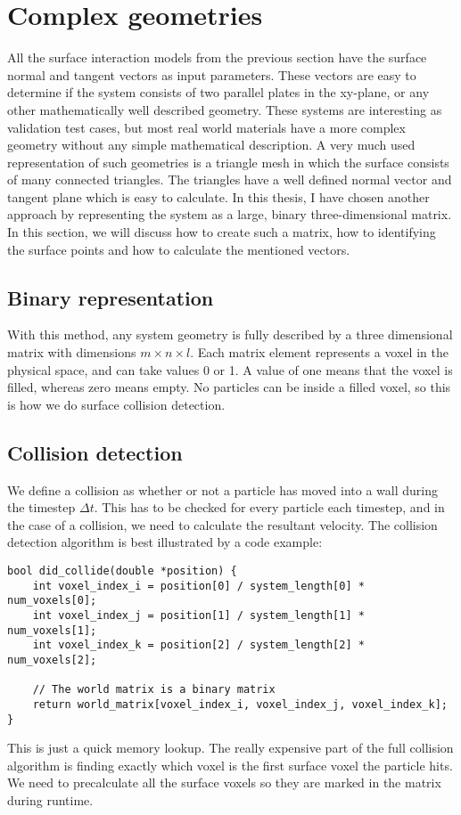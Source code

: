 \section{Complex geometries}
All the surface interaction models from the previous section have the surface normal and tangent vectors as input parameters. These vectors are easy to determine if the system consists of two parallel plates in the xy-plane, or any other mathematically well described geometry. These systems are interesting as validation test cases, but most real world materials have a more complex geometry without any simple mathematical description. A very much used representation of such geometries is a triangle mesh in which the surface consists of many connected triangles. The triangles have a well defined normal vector and tangent plane which is easy to calculate. In this thesis, I have chosen another approach by representing the system as a large, binary three-dimensional matrix. In this section, we will discuss how to create such a matrix, how to identifying the surface points and how to calculate the mentioned vectors.
\subsection{Binary representation}
With this method, any system geometry is fully described by a three dimensional matrix with dimensions $m\times n\times l$. Each matrix element represents a voxel in the physical space, and can take values 0 or 1. A value of one means that the voxel is filled, whereas zero means empty. No particles can be inside a filled voxel, so this is how we do surface collision detection. 
\subsection{Collision detection}
We define a collision as whether or not a particle has moved into a wall during the timestep $\Delta t$. This has to be checked for every particle each timestep, and in the case of a collision, we need to calculate the resultant velocity. The collision detection algorithm is best illustrated by a code example:
\begin{lstlisting}
bool did_collide(double *position) {
	int voxel_index_i = position[0] / system_length[0] * num_voxels[0];
	int voxel_index_j = position[1] / system_length[1] * num_voxels[1];
	int voxel_index_k = position[2] / system_length[2] * num_voxels[2];

	// The world matrix is a binary matrix
	return world_matrix[voxel_index_i, voxel_index_j, voxel_index_k];
}
\end{lstlisting}
This is just a quick memory lookup. The really expensive part of the full collision algorithm is finding exactly which voxel is the first surface voxel the particle hits. We need to precalculate all the surface voxels so they are marked in the matrix during runtime.
